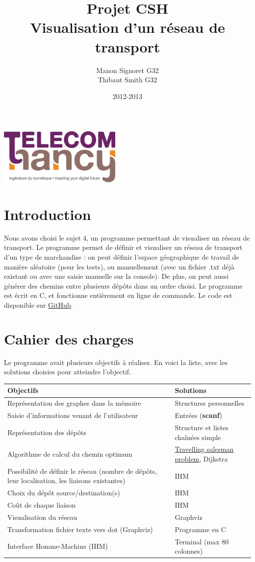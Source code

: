 \documentclass[12pt,a4paper]{report}
\date{2012-2013}
\author{Manon Signoret G32\\Thibaut Smith G32}
\title{Projet CSH\\Visualisation d'un r\'{e}seau de transport}
\makeatletter
\def\maketitle{
  \null
  \begin{flushleft}
   \includegraphics[width=6cm]{telecom_nancy.png}
  \end{flushleft}
  \vfill
  \begin{center}\leavevmode
    \normalfont
    {\LARGE \@title\par}
    {\Large \@date\par} 
    \vskip 1cm
    
  \end{center}
  \vfill
  \hfill
  \begin{flushright}
    {\Large \@author\par}
  \end{flushright}
  \cleardoublepage
  }
\makeatother
\begin{document}
\thispagestyle{empty}
\maketitle
\pagebreak

\section{Introduction}
Nous avons choisi le sujet 4, un programme permettant de visualiser un r\'{e}seau de transport. Le programme permet de d\'{e}finir et visualiser un r\'{e}seau de transport d'un type de marchandise : on peut d\'{e}finir l'espace g\'{e}ographique de travail de mani\`{e}re al\'{e}atoire (pour les tests), ou manuellement (avec un fichier .txt déjà existant ou avec une saisie manuelle sur la console). De plus, on peut aussi g\'{e}n\'{e}rer des chemins entre plusieurs d\'{e}pôts dans un ordre choisi. Le programme est \'{e}crit en C, et fonctionne enti\`{e}rement en ligne de commande. Le code est disponible sur \href{https://github.com/Videl/Graph-Visualization-Manager}{GitHub}.


\section{Cahier des charges}
Le programme avait plusieurs objectifs \`{a} r\'{e}aliser. En voici la liste, avec les solutions choisies pour atteindre l'objectif.

\begin{center}
  \begin{tabular}{|m{7cm}|m{7cm}|}
    \hline
    \textbf{Objectifs} & \textbf{Solutions} \\
    \hline
    Repr\'{e}sentation des graphes dans la m\'{e}moire       & Structures personnelles \\
    \hline
    Saisie d'informations venant de l'utilisateur    & Entr\'{e}es (\textbf{scanf}) \\
    \hline
    Repr\'{e}sentation des d\'{e}pôts                        & Structure et listes cha\^in\'{e}es simple \\
    \hline
    Algorithme de calcul du chemin optimum           & \href{https://en.wikipedia.org/wiki/Travelling_salesman_problem}{Travelling salesman problem}, Dijkstra \\
    \hline
    Possibilit\'{e} de d\'{e}finir le r\'{e}seau (nombre de d\'{e}p\^ots, leur localisation, les liaisons existantes)			     &	IHM \\
    \hline
    Choix du d\'{e}p\^ot source/destination(s)			 & IHM \\
    \hline
    Co\^ut de chaque liaison						 & IHM \\
    \hline
  	Visualisation du r\'{e}seau							 & Graphviz \\
    \hline
    Transformation fichier texte vers dot (Graphviz)     & Programme en C \\
    \hline
    Interface Homme-Machine (IHM)                    & Terminal (max 80 colonnes) \\
    \hline
    
  \end{tabular}
\end{center}
\end{document}
